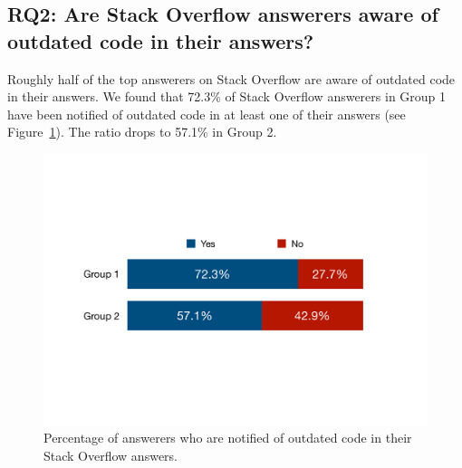 \documentclass{svjour3}                     %
\begin{document}
\subsection{RQ2: Are Stack Overflow answerers aware of outdated code in their answers?}

Roughly half of the top answerers on Stack Overflow
are aware of outdated code in their answers. We found that 72.3\% of Stack Overflow answerers in Group 1 have been notified of
outdated code in at least one of their answers (see Figure~\ref{fig:survey_outdated}). The ratio drops to 57.1\% in
Group 2. 

\begin{figure}
	\centering
	\includegraphics[width=.5\linewidth]{survey_outdated}
	\caption{Percentage of answerers who are notified of outdated code in their Stack Overflow answers.}
	\label{fig:survey_outdated}
\end{figure}
\end{document}
